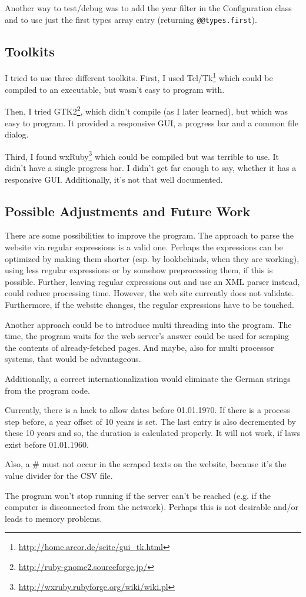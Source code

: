 \documentclass{scrartcl}
\begin{document}
Another way to test/debug was to add the year filter in the Configuration class and to use just the first types array entry (returning \texttt{@@types.first}).



\subsection{Toolkits}
\label{Toolkits}
I tried to use three different toolkits. First, I used Tcl/Tk\footnote{\url{http://home.arcor.de/scite/gui_tk.html}} which could be compiled to an executable, but wasn't easy to program with.

Then, I tried GTK2\footnote{\url{http://ruby-gnome2.sourceforge.jp/}}, which didn't compile (as I later learned), but which was easy to program. It provided a responsive GUI, a progress bar and a common file dialog.

Third, I found wxRuby\footnote{\url{http://wxruby.rubyforge.org/wiki/wiki.pl}} which could be compiled but was terrible to use. It didn't have a single progress bar. I didn't get far enough to say, whether it has a responsive GUI. Additionally, it's not that well documented.



\subsection{Possible Adjustments and Future Work}
There are some possibilities to improve the program. The approach to parse the website via regular expressions is a valid one. Perhaps the expressions can be optimized by making them shorter (esp. by lookbehinds, when they are working), using less regular expressions or by somehow preprocessing them, if this is possible. Further, leaving regular expressions out and use an XML parser instead, could reduce processing time. However, the web site currently does not validate. Furthermore, if the website changes, the regular expressions have to be touched.

Another approach could be to introduce multi threading into the program. The time, the program waits for the web server's answer could be used for scraping the contents of already-fetched pages. And maybe, also for multi processor systems, that would be advantageous.

Additionally, a correct internationalization would eliminate the German strings from the program code.

Currently, there is a hack to allow dates before 01.01.1970. If there is a process step before, a year offset of 10 years is set. The last entry is also decremented by these 10 years and so, the duration is calculated properly. It will not work, if laws exist before 01.01.1960.

Also, a \# must not occur in the scraped texts on the website, because it's the value divider for the CSV file.

The program won't stop running if the server can't be reached (e.g. if the computer is disconnected from the network). Perhaps this is not desirable and/or leads to memory problems.
\end{document}
